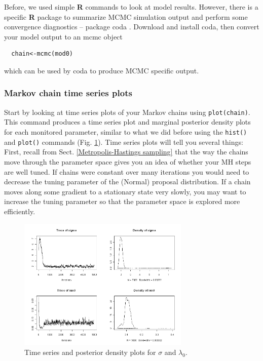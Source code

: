 Before, we used simple {\bf R} commands to look at model results. 
However, there is a specific {\bf R} package to summarize MCMC 
simulation output and perform some convergence diagnostics -- package 
coda \citep{plummer_etal:2006}. Download and install coda, then 
convert your model output to an mcmc object
\begin{verbatim}
  chain<-mcmc(mod0)
\end{verbatim} 
which can be used by coda to produce MCMC specific output.

\subsubsection{Markov chain time series plots}

Start by looking at time series plots of your Markov chains using 
\verb#plot(chain)#. This command produces a time series plot and
 marginal posterior density plots for each monitored parameter, 
 similar to what we did before using the \verb#hist()# and \verb#plot()# 
 commands (Fig. \ref{mcmc.fig.timeseries}). Time series plots will tell 
 you several things:
First, recall from Sect. \ref{Metropolis-Hastings sampling} that the way the chains move 
through the parameter space gives you an idea of whether your MH 
steps are well tuned. If chains were constant over many iterations 
you would need to decrease the tuning parameter of the (Normal) 
proposal distribution. If a chain moves along some gradient to a 
stationary state very slowly, you may want to increase the tuning 
parameter so that the parameter space is explored more efficiently.


\begin{figure}
\begin{center}
\includegraphics[height=2.5in]{Ch7/figs/timeseries}
\end{center}
\caption{Time series and posterior density plots for $\sigma$ and $\lambda_0$.}
\label{mcmc.fig.timeseries}
\end{figure}


